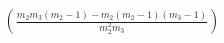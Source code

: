 \documentclass[preview]{standalone}
\begin{document}
\begin{align*}
\left(\frac{m_2 m_3( m_2 -1 ) - m_2 (m_2 -1) (m_3 - 1)}{m_2^2 m_3}\right)
\end{align*}
\end{document}
